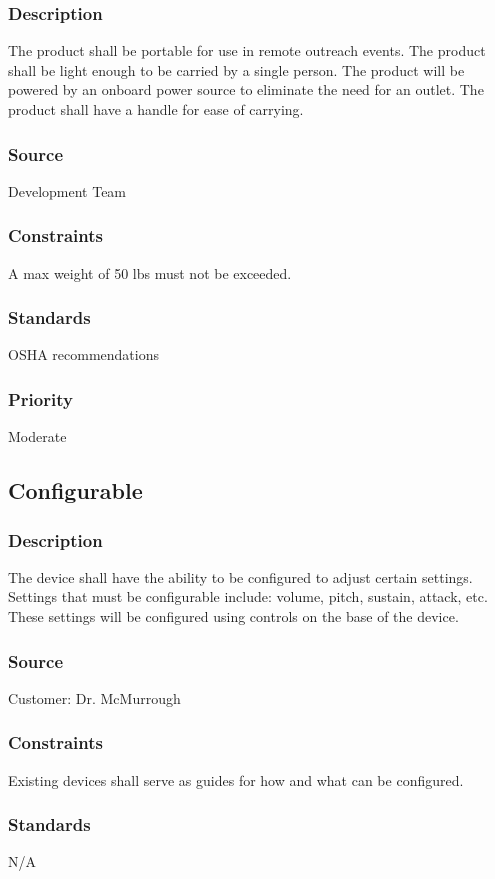 \subsubsection{Description}
The product shall be portable for use in remote outreach events. The product shall be light enough to be carried by a single person. The product will be powered by an onboard power source to eliminate the need for an outlet. The product shall have a handle for ease of carrying. 
\subsubsection{Source}
Development Team
\subsubsection{Constraints}
A max weight of 50 lbs must not be exceeded. 
\subsubsection{Standards}
OSHA recommendations 
\subsubsection{Priority}
Moderate

\subsection{Configurable}
\subsubsection{Description}
The device shall have the ability to be configured to adjust certain settings. Settings that must be configurable include: volume, pitch, sustain, attack, etc. These settings will be configured using controls on the base of the device. 
\subsubsection{Source}
Customer: Dr. McMurrough
\subsubsection{Constraints}
Existing devices shall serve as guides for how and what can be configured. 
\subsubsection{Standards}
N/A
